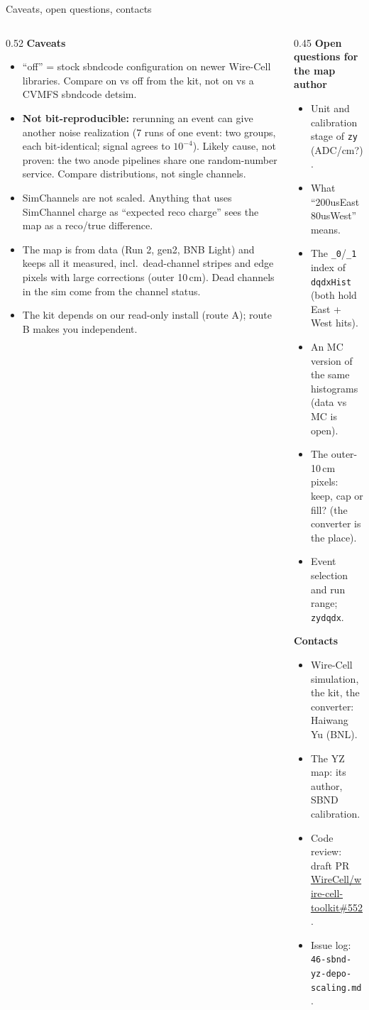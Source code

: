 \documentclass[aspectratio=169,10pt]{beamer}
\newcommand{\code}[1]{\texttt{#1}}
\begin{document}
\begin{frame}{Caveats, open questions, contacts}
\footnotesize
\begin{columns}[T]
\begin{column}{0.52\textwidth}
\textbf{Caveats}
\begin{itemize}
\item ``off'' = stock sbndcode configuration on newer Wire-Cell libraries. Compare on vs off from the kit, not on vs a CVMFS sbndcode detsim.
\item \textbf{Not bit-reproducible:} rerunning an event can give another noise realization (7 runs of one event: two groups, each bit-identical; signal agrees to $10^{-4}$). Likely cause, not proven: the two anode pipelines share one random-number service. Compare distributions, not single channels.
\item SimChannels are not scaled. Anything that uses SimChannel charge as ``expected reco charge'' sees the map as a reco/true difference.
\item The map is from data (Run 2, gen2, BNB Light) and keeps all it measured, incl.\ dead-channel stripes and edge pixels with large corrections (outer 10\,cm). Dead channels in the sim come from the channel status.
\item The kit depends on our read-only install (route A); route B makes you independent.
\end{itemize}
\end{column}
\begin{column}{0.45\textwidth}
\textbf{Open questions for the map author}
\begin{itemize}
\item Unit and calibration stage of \code{zy} (ADC/cm?).
\item What ``200usEast80usWest'' means.
\item The \code{\_0}/\code{\_1} index of \code{dqdxHist} (both hold East + West hits).
\item An MC version of the same histograms (data vs MC is open).
\item The outer-10\,cm pixels: keep, cap or fill? (the converter is the place).
\item Event selection and run range; \code{zydqdx}.
\end{itemize}
\vspace{2mm}
\textbf{Contacts}
\begin{itemize}
\item Wire-Cell simulation, the kit, the converter: Haiwang Yu (BNL).
\item The YZ map: its author, SBND calibration.
\item Code review: draft PR \href{https://github.com/WireCell/wire-cell-toolkit/pull/552}{WireCell/wire-cell-toolkit\#552}.
\item Issue log: \code{46-sbnd-yz-depo-scaling.md}.
\end{itemize}
\end{column}
\end{columns}
\end{frame}
\end{document}
